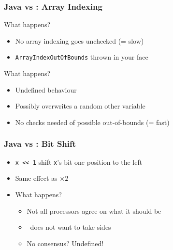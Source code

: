 \begin{frame}
  \frametitle{Java vs \cpp: Array Indexing}
  \begin{overprint}
    \begin{center}
      What happens?
    \end{center}

    \begin{itemize}
      \item No array indexing goes unchecked (= slow)
      \item \texttt{ArrayIndexOutOfBounds} thrown in your face
    \end{itemize}
  \end{overprint}
  \vskip2mm
  \structure{\cpp}
  \begin{overprint}
    \begin{center}
      What happens?
    \end{center}

    \begin{itemize}
      \item Undefined behaviour
      \item Possibly overwrites a random other variable
      \item No checks needed of possible out-of-bounds (= fast)
    \end{itemize}
  \end{overprint}
\end{frame}

\begin{frame}
  \frametitle{Java vs \cpp: Bit Shift}
  \begin{itemize}
    \item \texttt{x {<}{<} 1} shift \texttt{x}'s bit one position to the left
    \item Same effect as $\times 2$
    \item What happens?
          \begin{itemize}
            \item<2> Not all processors agree on what it should be
            \item<2> \cpp\ does not want to take sides
            \item<2> No consensus? Undefined!
          \end{itemize}
  \end{itemize}
\end{frame}

